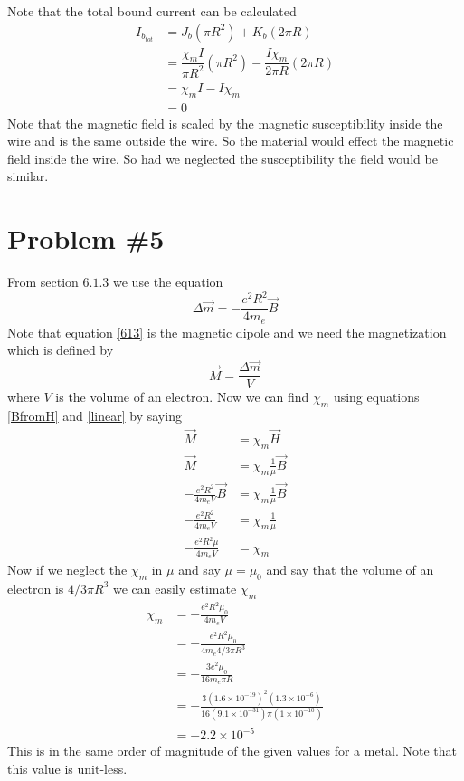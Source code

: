 \documentclass[11pt]{article}
\numberwithin{equation}{section}
\begin{document}
Note that the total bound current can be calculated  
\begin{align*}
I_{b_{tot}} &= J_b(\pi R^2) + K_b(2\pi R)\\
&= \dfrac{\chi_mI}{\pi R^2}(\pi R^2) - \dfrac{I\chi_m}{2\pi R}(2\pi R)\\
&= {\chi_mI} - {I\chi_m}\\
&=0
\end{align*}
Note that the magnetic field is scaled by the magnetic susceptibility inside the wire and is the same outside the wire. So the material would effect the magnetic field inside the wire. So had we neglected the susceptibility the field would be similar.

\section{Problem \#5}
From section $6.1.3$ we use the equation
\begin{equation}
\Delta \vec{m} = -\frac{e^2R^2}{4m_e}\vec{B}
\label{613}
\end{equation}
Note that equation \ref{613} is the magnetic dipole and we need the magnetization which is defined by
$$\vec{M} = \frac{\Delta \vec{m}}{V}$$
where $V$ is the volume of an electron. Now we can find $\chi_m$ using equations \ref{BfromH} and \ref{linear} by saying
\begin{align*}
\vec{M} &= \chi_m\vec{H}\\
\vec{M} &= \chi_m\frac{1}{\mu}\vec{B}\\
-\frac{e^2R^2}{4m_eV}\vec{B}&= \chi_m\frac{1}{\mu}\vec{B}\\
-\frac{e^2R^2}{4m_eV} &= \chi_m\frac{1}{\mu}\\
-\frac{e^2R^2\mu}{4m_eV} &= \chi_m
\end{align*}
Now if we neglect the $\chi_m$ in $\mu$ and say $\mu=\mu_0$ and say that the volume of an electron is $4/3 \pi R^3$ we can easily estimate $\chi_m$
\begin{align*}
\chi_m &= -\frac{e^2R^2\mu_0}{4m_eV}\\
&= -\frac{e^2R^2\mu_0}{4m_e4/3 \pi R^3}\\
&= -\frac{3e^2\mu_0}{16m_e\pi R}\\
&= -\frac{3(1.6\times10^{-19})^2(1.3\times10^{-6})}{16(9.1\times10^{-31})\pi (1\times10^{-10})}\\
&= -2.2\times10^{-5}
\end{align*}
This is in the same order of magnitude of the given values for a metal. Note that this value is unit-less.
\end{document}
